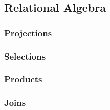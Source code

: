 \subsection{Relational Algebra}
\subsubsection{Projections}
\subsubsection{Selections}
\subsubsection{Products}
\subsubsection{Joins}